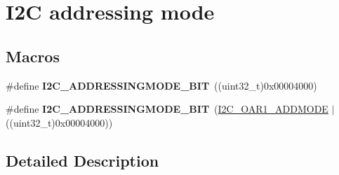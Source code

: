 \hypertarget{group___i2_c__addressing__mode}{}\section{I2C addressing mode}
\label{group___i2_c__addressing__mode}
\subsection*{Macros}
\begin{DoxyCompactItemize}
\item 
\#define {\bfseries I2\+C\+\_\+\+A\+D\+D\+R\+E\+S\+S\+I\+N\+G\+M\+O\+D\+E\+\_\+B\+IT}~((uint32\+\_\+t)0x00004000)\hypertarget{group___i2_c__addressing__mode_ga28cf3b277595ac15edf383c2574ed18d}{}\label{group___i2_c__addressing__mode_ga28cf3b277595ac15edf383c2574ed18d}

\item 
\#define {\bfseries I2\+C\+\_\+\+A\+D\+D\+R\+E\+S\+S\+I\+N\+G\+M\+O\+D\+E\+\_\+B\+IT}~(\hyperlink{group___peripheral___registers___bits___definition_ga7d8df80cd27313c896e887aae81fa639}{I2\+C\+\_\+\+O\+A\+R1\+\_\+\+A\+D\+D\+M\+O\+DE} $\vert$ ((uint32\+\_\+t)0x00004000))\hypertarget{group___i2_c__addressing__mode_ga2401dc32e64cd53290497bab73c3608d}{}\label{group___i2_c__addressing__mode_ga2401dc32e64cd53290497bab73c3608d}

\end{DoxyCompactItemize}


\subsection{Detailed Description}
